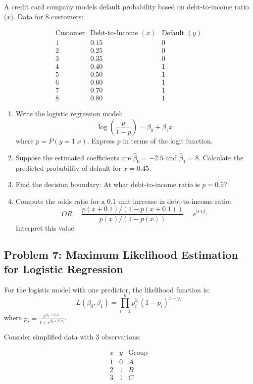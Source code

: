 \documentclass[12pt]{article}
\begin{document}
A credit card company models default probability based on debt-to-income ratio (\(x\)). Data for 8 customers:

\[
\begin{array}{c|c|c}
\text{Customer} & \text{Debt-to-Income } (x) & \text{Default } (y) \\
\hline
1 & 0.15 & 0 \\
2 & 0.25 & 0 \\
3 & 0.35 & 0 \\
4 & 0.40 & 1 \\
5 & 0.50 & 1 \\
6 & 0.60 & 1 \\
7 & 0.70 & 1 \\
8 & 0.80 & 1
\end{array}
\]

\begin{enumerate}[label=(\alph*)]
\item Write the logistic regression model:
\[
\log\left(\frac{p}{1-p}\right) = \beta_0 + \beta_1 x
\]
where \(p = P(y = 1 | x)\). Express \(p\) in terms of the logit function.

\item Suppose the estimated coefficients are \(\hat{\beta}_0 = -2.5\) and \(\hat{\beta}_1 = 8\). Calculate the predicted probability of default for \(x = 0.45\).

\item Find the decision boundary: At what debt-to-income ratio is \(p = 0.5\)?

\item Compute the odds ratio for a 0.1 unit increase in debt-to-income ratio:
\[
OR = \frac{p(x + 0.1) / (1 - p(x + 0.1))}{p(x) / (1 - p(x))} = e^{0.1\beta_1}
\]
Interpret this value.
\end{enumerate}

\subsection*{Problem 7: Maximum Likelihood Estimation for Logistic Regression}

For the logistic model with one predictor, the likelihood function is:
\[
L(\beta_0, \beta_1) = \prod_{i=1}^{n} p_i^{y_i}(1-p_i)^{1-y_i}
\]
where \(p_i = \frac{e^{\beta_0 + \beta_1 x_i}}{1 + e^{\beta_0 + \beta_1 x_i}}\).

Consider simplified data with 3 observations:

\[
\begin{array}{c|c|c}
x & y & \text{Group} \\
\hline
1 & 0 & A \\
2 & 1 & B \\
3 & 1 & C
\end{array}
\]
\end{document}
